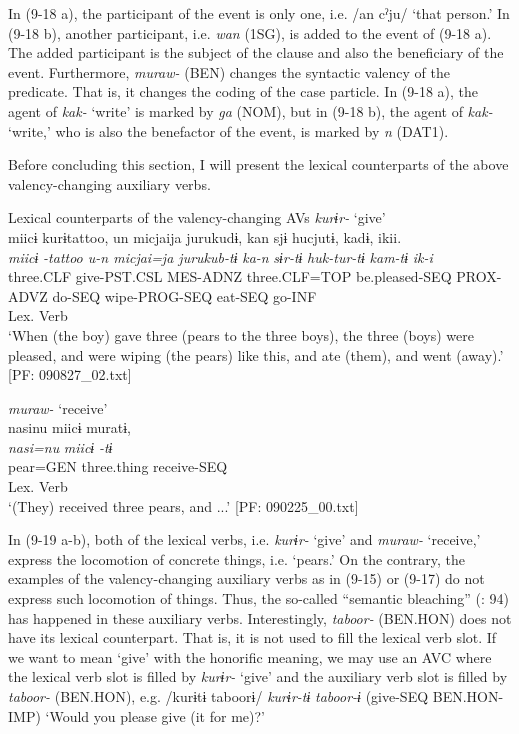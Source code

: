 In (9-18 a), the participant of the event is only one, i.e. /an cˀju/ ‘that person.’ In (9-18 b), another participant, i.e. \textit{wan} (1SG), is added to the event of (9-18 a). The added participant is the subject of the clause and also the beneficiary of the event. Furthermore, \textit{muraw-} (BEN) changes the syntactic valency of the predicate. That is, it changes the coding of the case particle. In (9-18 a), the agent of \textit{kak-} ‘write’ is marked by \textit{ga} (NOM), but in (9-18 b), the agent of \textit{kak-} ‘write,’ who is also the benefactor of the event, is marked by \textit{n} (DAT1).

  Before concluding this section, I will present the lexical counterparts of the above valency-changing auxiliary verbs.

\ea   Lexical counterparts of the valency-changing AVs \label{ex:9.19}
\ea \textit{kurɨr-} ‘give’\\
   \gllll miicɨ  kurɨtattoo,  un  micjaija  jurukudɨ, kan  sjɨ  hucjutɨ,  kadɨ,  ikii.\\
    \textit{miicɨ}  \textit{-tattoo  u-n  micjai=ja  jurukub-tɨ}  \textit{ka-n}  \textit{sɨr-tɨ}  \textit{huk-tur-tɨ}  \textit{kam-tɨ}  \textit{ik-i}\\
    three.CLF  give-PST.CSL  MES-ADNZ  three.CLF=TOP  be.pleased-SEQ  PROX-ADVZ  do-SEQ  wipe-PROG-SEQ  eat-SEQ  go-INF\\
      Lex. Verb    \\
    \glt  ‘When (the boy) gave three (pears to the three boys), the three (boys) were pleased, and were wiping (the pears) like this, and ate (them), and went (away).’   [PF: 090827\_02.txt]

\ex \textit{muraw-} ‘receive’\\
 \gllll  nasinu  miicɨ  muratɨ,\\
    \textit{nasi=nu}  \textit{miicɨ}  \textit{-tɨ}\\
    pear=GEN  three.thing  receive-SEQ\\
        Lex. Verb\\
    \glt     ‘(They) received three pears, and ...’ [PF: 090225\_00.txt]
  \z
\z

In (9-19 a-b), both of the lexical verbs, i.e. \textit{kurɨr-} ‘give’ and \textit{muraw-} ‘receive,’ express the locomotion of concrete things, i.e. ‘pears.’ On the contrary, the examples of the valency-changing auxiliary verbs as in (9-15) or (9-17) do not express such locomotion of things. Thus, the so-called “semantic bleaching” (\citealt{HopperTraugott2003}: 94) has happened in these auxiliary verbs. Interestingly, \textit{taboor-} (BEN.HON) does not have its lexical counterpart. That is, it is not used to fill the lexical verb slot. If we want to mean ‘give’ with the honorific meaning, we may use an AVC where the lexical verb slot is filled by \textit{kurɨr-} ‘give’ and the auxiliary verb slot is filled by \textit{taboor-} (BEN.HON), e.g. /kurɨtɨ taboorɨ/ \textit{kurɨr-tɨ} \textit{taboor-ɨ} (give-SEQ BEN.HON-IMP) ‘Would you please give (it for me)?’

